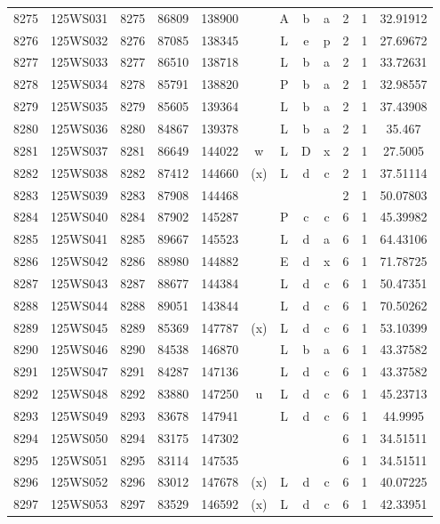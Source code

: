 \begin{tabular}{|*{12}{c|}}
8275 & 125WS031 & 8275 & 86809 & 138900 &  & A & b & a & 2 & 1 & 32.91912 \\ 
8276 & 125WS032 & 8276 & 87085 & 138345 &  & L & e & p & 2 & 1 & 27.69672 \\ 
8277 & 125WS033 & 8277 & 86510 & 138718 &  & L & b & a & 2 & 1 & 33.72631 \\ 
8278 & 125WS034 & 8278 & 85791 & 138820 &  & P & b & a & 2 & 1 & 32.98557 \\ 
8279 & 125WS035 & 8279 & 85605 & 139364 &  & L & b & a & 2 & 1 & 37.43908 \\ 
8280 & 125WS036 & 8280 & 84867 & 139378 &  & L & b & a & 2 & 1 & 35.467 \\ 
8281 & 125WS037 & 8281 & 86649 & 144022 & w & L & D & x & 2 & 1 & 27.5005 \\ 
8282 & 125WS038 & 8282 & 87412 & 144660 & (x) & L & d & c & 2 & 1 & 37.51114 \\ 
8283 & 125WS039 & 8283 & 87908 & 144468 &  &  &  &  & 2 & 1 & 50.07803 \\ 
8284 & 125WS040 & 8284 & 87902 & 145287 &  & P & c & c & 6 & 1 & 45.39982 \\ 
8285 & 125WS041 & 8285 & 89667 & 145523 &  & L & d & a & 6 & 1 & 64.43106 \\ 
8286 & 125WS042 & 8286 & 88980 & 144882 &  & E & d & x & 6 & 1 & 71.78725 \\ 
8287 & 125WS043 & 8287 & 88677 & 144384 &  & L & d & c & 6 & 1 & 50.47351 \\ 
8288 & 125WS044 & 8288 & 89051 & 143844 &  & L & d & c & 6 & 1 & 70.50262 \\ 
8289 & 125WS045 & 8289 & 85369 & 147787 & (x) & L & d & c & 6 & 1 & 53.10399 \\ 
8290 & 125WS046 & 8290 & 84538 & 146870 &  & L & b & a & 6 & 1 & 43.37582 \\ 
8291 & 125WS047 & 8291 & 84287 & 147136 &  & L & d & c & 6 & 1 & 43.37582 \\ 
8292 & 125WS048 & 8292 & 83880 & 147250 & u & L & d & c & 6 & 1 & 45.23713 \\ 
8293 & 125WS049 & 8293 & 83678 & 147941 &  & L & d & c & 6 & 1 & 44.9995 \\ 
8294 & 125WS050 & 8294 & 83175 & 147302 &  &  &  &  & 6 & 1 & 34.51511 \\ 
8295 & 125WS051 & 8295 & 83114 & 147535 &  &  &  &  & 6 & 1 & 34.51511 \\ 
8296 & 125WS052 & 8296 & 83012 & 147678 & (x) & L & d & c & 6 & 1 & 40.07225 \\ 
8297 & 125WS053 & 8297 & 83529 & 146592 & (x) & L & d & c & 6 & 1 & 42.33951 \\ 

\end{tabular}
